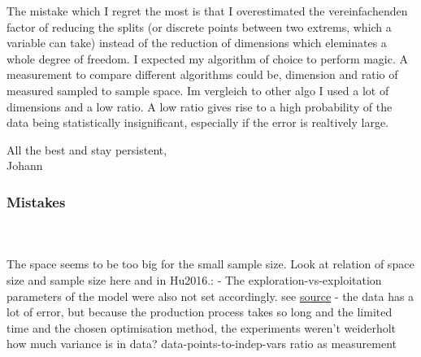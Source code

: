 The mistake which I regret the most is that I overestimated the vereinfachenden factor of reducing the splits (or discrete points between two extrems, which a variable can take) instead of the reduction of dimensions which eleminates a whole degree of freedom. 
I expected my algorithm of choice to perform magic. 
A measurement to compare different algorithms could be, dimension and ratio of measured sampled to sample space. 
Im vergleich to other algo I used a lot of dimensions and a low ratio.
A low ratio gives rise to a high probability of the data being statistically insignificant, especially if the error is realtively large. 

All the best and stay persistent, \\  
Johann \\
\fi


\subsubsection{Mistakes} 
\\
\\
The space seems to be too big for the small sample size.
Look at relation of space size and sample size here and in Hu2016.:
%
- The exploration-vs-exploitation parameters of the model were also not set accordingly.
see \href{https://search.r-project.org/CRAN/refmans/emma/html/emma.html}{source}
%
- the data has a lot of error, but because the production process takes so long and the 
limited time and the chosen optimisation method, the experiments weren't weiderholt
how much variance is in data? 
%
data-points-to-indep-vars ratio as measurement
